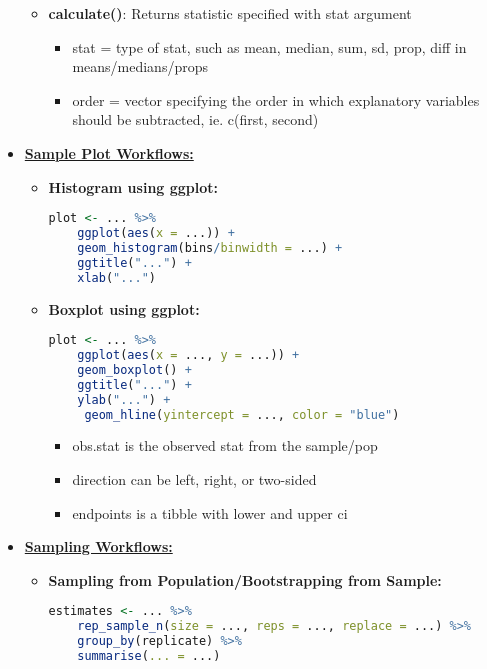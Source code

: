 \documentclass[8pt,landscape,a4paper, fleqn, dvipsnames]{extarticle}
\begin{document}
\begin{multicols*}{4}
\begin{itemize}
\begin{itemize}
\begin{itemize}
        \end{itemize}
        \item \textbf{calculate()}: Returns statistic specified with stat argument
        \begin{itemize}
            \item stat = type of stat, such as mean, median, sum, sd, prop, diff in means/medians/props
            \item order = vector specifying the order in which explanatory variables should be subtracted, ie. c(first, second)
        \end{itemize}
    \end{itemize}
    \item \textbf{\underline{Sample Plot Workflows:}}
    \begin{itemize}
        \item \textbf{Histogram using ggplot:}
        \begin{lstlisting}[language = R]
plot <- ... %>%
    ggplot(aes(x = ...)) +
    geom_histogram(bins/binwidth = ...) +
    ggtitle("...") +
    xlab("...")
        \end{lstlisting}
        \item \textbf{Boxplot using ggplot:}
        \begin{lstlisting}[language = R]
plot <- ... %>%
    ggplot(aes(x = ..., y = ...)) +
    geom_boxplot() +
    ggtitle("...") +
    ylab("...") +
     geom_hline(yintercept = ..., color = "blue")
        \end{lstlisting}
        \begin{itemize}
            \item obs.stat is the observed stat from the sample/pop
            \item direction can be left, right, or two-sided
            \item endpoints is a tibble with lower and upper ci
        \end{itemize}
    \end{itemize}
    \item \textbf{\underline{Sampling Workflows:}}
    \begin{itemize}
        \item \textbf{Sampling from Population/Bootstrapping from Sample:}
        \begin{lstlisting}[language = R]
estimates <- ... %>%
    rep_sample_n(size = ..., reps = ..., replace = ...) %>%
    group_by(replicate) %>%
    summarise(... = ...)
        \end{lstlisting}

\end{itemize}
\end{itemize}
\end{multicols*}
\end{document}
